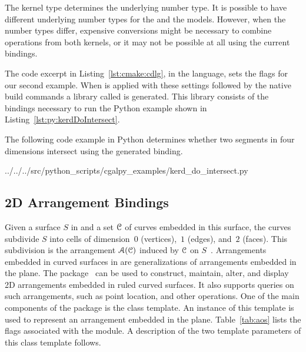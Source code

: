 The kernel type determines the underlying number type. It is possible to have different underlying number types for the \iiDandiiiDGeometryKernelPackage{} and the \dDGeometryKernelPackage{} models. However, when the number types differ, expensive conversions
might be necessary to combine operations from both kernels, or it may not be possible at all using the current bindings.

The code excerpt in Listing~\ref{lst:cmake:cdlg}, in the \cmake{} language, sets the \cmake{} flags for our second example. When  is applied with these settings followed by the native build commands a library called  is generated. This library consists of the bindings necessary to run the Python example shown in Listing~\ref{lst:py:kerdDoIntersect}.

\begin{lstfloat}

\end{lstfloat}

The following code example in Python determines whether two segments in four dimensions intersect using the generated binding.

\begin{lstfloat}
 {../../../src/python_scripts/cgalpy_examples/kerd_do_intersect.py}
\end{lstfloat}

\subsection{2D Arrangement Bindings}
\label{ssec:modules:aos2}
Given a surface $S$ in \Rthree{} and a set ${\cal C}$ of curves embedded in this surface, the curves subdivide $S$ into cells of dimension~$0$ (vertices),~$1$ (edges), and~$2$ (faces). This subdivision is the arrangement ${\cal A}({\cal C})$ induced by ${\cal C}$ on $S$~\cite{fhw-caass-12}. Arrangements embedded in curved surfaces in \Rthree{} are generalizations of arrangements embedded in the plane. The \iiDArrangementsPackage{} package~\cite{cgal:wfzh-a2-21a} can be used to construct, maintain, alter, and display 2D arrangements embedded in ruled curved surfaces. It also supports queries on such arrangements, such as point location, and other operations. One of the main components of the \iiDArrangementsPackage{} package is the  class template. An instance of this template is used to represent an arrangement embedded in the plane.  Table~\ref{tab:aos} lists the \cmake{} flags associated with the \iiDArrangementsPackage{} module.
A description of the two template parameters of this class template follows.

